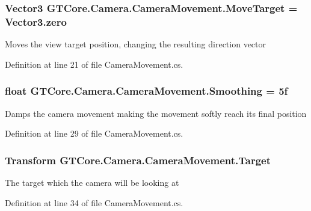 \subsubsection[{Move\+Target}]{\setlength{\rightskip}{0pt plus 5cm}Vector3 G\+T\+Core.\+Camera.\+Camera\+Movement.\+Move\+Target = Vector3.\+zero}\label{class_g_t_core_1_1_camera_1_1_camera_movement_a6e6ee6e6693f79f8280cbd3a00787f01}


Moves the view target position, changing the resulting direction vector 



Definition at line 21 of file Camera\+Movement.\+cs.

\hypertarget{class_g_t_core_1_1_camera_1_1_camera_movement_a65a4a371001a930368dc17f51c6f7b77}{}
\subsubsection[{Smoothing}]{\setlength{\rightskip}{0pt plus 5cm}float G\+T\+Core.\+Camera.\+Camera\+Movement.\+Smoothing = 5f}\label{class_g_t_core_1_1_camera_1_1_camera_movement_a65a4a371001a930368dc17f51c6f7b77}


Damps the camera movement making the movement softly reach its final position 



Definition at line 29 of file Camera\+Movement.\+cs.

\hypertarget{class_g_t_core_1_1_camera_1_1_camera_movement_a90c325f21f94e65dc0347a239bce2147}{}
\subsubsection[{Target}]{\setlength{\rightskip}{0pt plus 5cm}Transform G\+T\+Core.\+Camera.\+Camera\+Movement.\+Target}\label{class_g_t_core_1_1_camera_1_1_camera_movement_a90c325f21f94e65dc0347a239bce2147}


The target which the camera will be looking at 



Definition at line 34 of file Camera\+Movement.\+cs.



